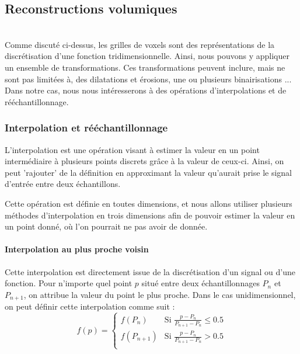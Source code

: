 {{		%
		\subsection{Reconstructions volumiques}
		{
			\\

			Comme discuté ci-dessus, les grilles de voxels sont des représentations de la discrétisation d'une fonction tridimensionnelle. Ainsi, nous pouvons y appliquer un ensemble de transformations. Ces transformations peuvent inclure, mais ne sont pas limitées à, des dilatations et érosions, une ou plusieurs binairisations ... Dans notre cas, nous nous intéresserons à des opérations d'interpolations et de rééchantillonnage.\par
	
			\subsubsection{Interpolation et rééchantillonnage}
			{
				\par

				L'interpolation est une opération visant à estimer la valeur en un point intermédiaire à plusieurs points discrets grâce à la valeur de ceux-ci. Ainsi, on peut 'rajouter' de la définition en approximant la valeur qu'aurait prise le signal d'entrée entre deux échantillons.\par
				\par
				Cette opération est définie en toutes dimensions, et nous allons utiliser plusieurs méthodes d'interpolation en trois dimensions afin de pouvoir estimer la valeur en un point donné, où l'on pourrait ne pas avoir de donnée.\par

				\paragraph*{Interpolation au plus proche voisin}
				{
					Cette interpolation est directement issue de la discrétisation d'un signal ou d'une fonction. Pour n'importe quel point $p$ situé entre deux échantillonnages $P_n$ et $P_{n+1}$, on attribue la valeur du point le plus proche. Dans le cas unidimensionnel, on peut définir cette interpolation comme suit :\\
					\[f(p) = \left\{\begin{array}{ll} f(P_n) & \text{Si }\frac{p-P_n}{P_{n+1}-P_n}\leq0.5 \\ f(P_{n+1}) & \text{Si }\frac{p-P_n}{P_{n+1}-P_n}>0.5 \\\end{array}\right.\]
					\par
					\par

}}}}}
